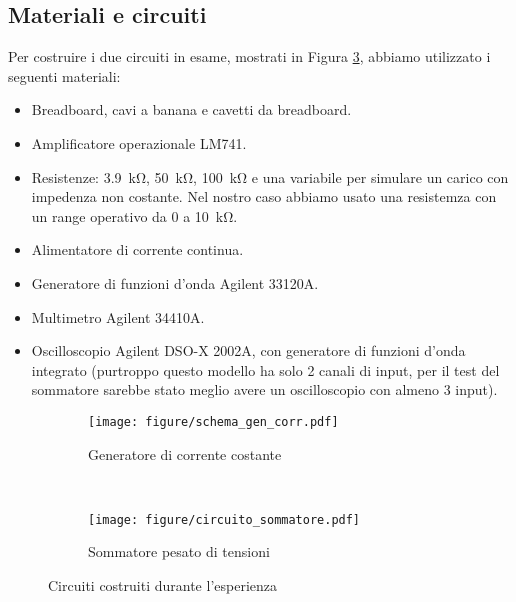 \subsection{Materiali e circuiti}

Per costruire i due circuiti in esame, mostrati in Figura \ref{fig:circuits},
abbiamo utilizzato i seguenti materiali:

\begin{itemize}
    \item{Breadboard, cavi a banana e cavetti da breadboard.}
    \item{Amplificatore operazionale LM741.}
    \item{Resistenze: \SI{3.9}{\kilo\ohm}, \SI{50}{\kilo\ohm}, \SI{100}{\kilo\ohm}
        e una variabile per simulare un carico con impedenza non costante. Nel nostro caso abbiamo
        usato una resistemza con un range operativo da 0 a \SI{10}{\kilo\ohm}.}
    \item{Alimentatore di corrente continua.}
    \item{Generatore di funzioni d'onda Agilent 33120A.}
    \item{Multimetro Agilent 34410A.}
    \item{Oscilloscopio Agilent DSO-X 2002A, con generatore di funzioni d'onda integrato
        (purtroppo questo modello ha solo 2 canali di input,
        per il test del sommatore sarebbe stato meglio avere un oscilloscopio con almeno 3 input).}
\end{itemize}

\begin{figure}[h]
        \centering
        \begin{subfigure}[b]{0.48\textwidth}
                \texttt{[image: figure/schema\_gen\_corr.pdf]}
                \caption{Generatore di corrente costante}
                \label{fig:generatore}
        \end{subfigure}
        ~
        \begin{subfigure}[b]{0.48\textwidth}
                \texttt{[image: figure/circuito\_sommatore.pdf]}
                \caption{Sommatore pesato di tensioni}
                \label{fig:sommatore}
        \end{subfigure}
        \caption{Circuiti costruiti durante l'esperienza}
        \label{fig:circuits}
\end{figure}


